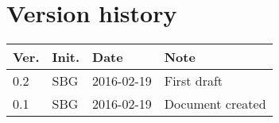 \chapter*{Version history}
\label{app:rev_his}


\begin{tabular}{b{1cm} b{1cm} b{2cm} b{8cm}}
    \textbf{Ver.} & \textbf{Init.} & \textbf{Date} & \textbf{Note} \\
    \hline
    0.2 & SBG & 2016-02-19 & First draft \\
    0.1 & SBG & 2016-02-19 & Document created \\
\end{tabular}
